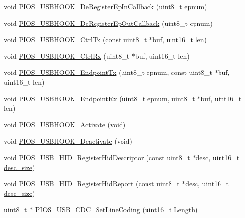 \begin{DoxyCompactItemize}
\item 
void \hyperlink{group___p_i_o_s___u_s_b_h_o_o_k_gab625794d48d586353a8d1b81d2abaa10}{\-P\-I\-O\-S\-\_\-\-U\-S\-B\-H\-O\-O\-K\-\_\-\-De\-Register\-Ep\-In\-Callback} (uint8\-\_\-t epnum)
\item 
void \hyperlink{group___p_i_o_s___u_s_b_h_o_o_k_gaee6a7cfd0b24ed7e41097a3629f25a1d}{\-P\-I\-O\-S\-\_\-\-U\-S\-B\-H\-O\-O\-K\-\_\-\-De\-Register\-Ep\-Out\-Callback} (uint8\-\_\-t epnum)
\item 
void \hyperlink{group___p_i_o_s___u_s_b_h_o_o_k_ga6704b03262547936a31c1c9798c7cee0}{\-P\-I\-O\-S\-\_\-\-U\-S\-B\-H\-O\-O\-K\-\_\-\-Ctrl\-Tx} (const uint8\-\_\-t $\ast$buf, uint16\-\_\-t len)
\item 
void \hyperlink{group___p_i_o_s___u_s_b_h_o_o_k_ga1fdfbec3bfa53133f72ac8acff597415}{\-P\-I\-O\-S\-\_\-\-U\-S\-B\-H\-O\-O\-K\-\_\-\-Ctrl\-Rx} (uint8\-\_\-t $\ast$buf, uint16\-\_\-t len)
\item 
void \hyperlink{group___p_i_o_s___u_s_b_h_o_o_k_ga7f8bef536a231085c493d004ec8466d2}{\-P\-I\-O\-S\-\_\-\-U\-S\-B\-H\-O\-O\-K\-\_\-\-Endpoint\-Tx} (uint8\-\_\-t epnum, const uint8\-\_\-t $\ast$buf, uint16\-\_\-t len)
\item 
void \hyperlink{group___p_i_o_s___u_s_b_h_o_o_k_ga9ff507855511c9dcf36f8839955e4c86}{\-P\-I\-O\-S\-\_\-\-U\-S\-B\-H\-O\-O\-K\-\_\-\-Endpoint\-Rx} (uint8\-\_\-t epnum, uint8\-\_\-t $\ast$buf, uint16\-\_\-t len)
\item 
void \hyperlink{group___p_i_o_s___u_s_b_h_o_o_k_gaa9dd93041af333771c368a4eb0171caa}{\-P\-I\-O\-S\-\_\-\-U\-S\-B\-H\-O\-O\-K\-\_\-\-Activate} (void)
\item 
void \hyperlink{group___p_i_o_s___u_s_b_h_o_o_k_ga0b91e1af1f658ed36ac3da1414dd1dae}{\-P\-I\-O\-S\-\_\-\-U\-S\-B\-H\-O\-O\-K\-\_\-\-Deactivate} (void)
\item 
void \hyperlink{group___p_i_o_s___u_s_b_h_o_o_k_gaba51a804e2ee3df6834af3d37d15ecd0}{\-P\-I\-O\-S\-\_\-\-U\-S\-B\-\_\-\-H\-I\-D\-\_\-\-Register\-Hid\-Descriptor} (const uint8\-\_\-t $\ast$desc, uint16\-\_\-t \hyperlink{pios__board__info_8h_ae5d617056baa2cb80f47bfcef73f2b69}{desc\-\_\-size})
\item 
void \hyperlink{group___p_i_o_s___u_s_b_h_o_o_k_gaa26752754b2018e8584247b715c9500c}{\-P\-I\-O\-S\-\_\-\-U\-S\-B\-\_\-\-H\-I\-D\-\_\-\-Register\-Hid\-Report} (const uint8\-\_\-t $\ast$desc, uint16\-\_\-t \hyperlink{pios__board__info_8h_ae5d617056baa2cb80f47bfcef73f2b69}{desc\-\_\-size})
\item 
uint8\-\_\-t $\ast$ \hyperlink{group___p_i_o_s___u_s_b_h_o_o_k_gaf660c51dbd2a8174a34e43b02f6774e0}{\-P\-I\-O\-S\-\_\-\-U\-S\-B\-\_\-\-C\-D\-C\-\_\-\-Set\-Line\-Coding} (uint16\-\_\-t \-Length)

\end{DoxyCompactItemize}
